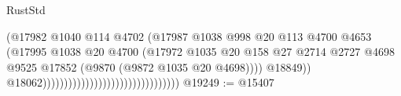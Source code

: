 \begin{lexlean}{RustStd}
\begin{coremodule}
{\begin{coremodule}
{{{{{{{{{{{{{{{{{{{{{{{{{{{{{{{{{{{{{{{                                                                    (@17982
                                                                      @1040
                                                                      @114
                                                                      @4702
                                                                      (@17987
                                                                        @1038
                                                                        @998
                                                                        @20
                                                                        @113
                                                                        @4700
                                                                        @4653
                                                                        (@17995
                                                                          @1038
                                                                          @20
                                                                          @4700
                                                                          (@17972
                                                                            @1035
                                                                            @20
                                                                            @158
                                                                            @27
                                                                            @2714
                                                                            @2727
                                                                            @4698
                                                                            @9525
                                                                            @17852
                                                                            (@9870
                                                                              (@9872
                                                                                @1035
                                                                                @20
                                                                                @4698))))
                                                                        @18849))
                                                                    @18062))))))))))))))))))))))))))))))))
@19249 := @15407
}}}}}}}}}}}}}}}}}}}}}}}}}}}}}}}}}}}}}}}
\end{coremodule}}
\end{coremodule}
\end{lexlean}
